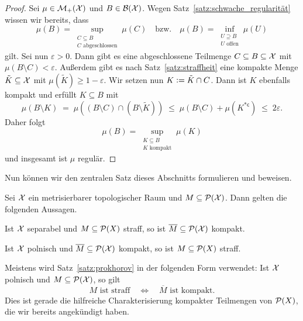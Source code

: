 \documentclass[../thesis/thesis.tex]{subfiles}
\begin{document}
	\begin{proof}
		Sei $\mu \in \mathcal{M}_{+}(\mathcal{X})$ und $B \in \mathcal{B}(\mathcal{X})$. 
		Wegen Satz~\ref{satz:schwache_regularität} wissen wir bereits, dass 
		\[\mu(B) = \sup_{\substack{C \subseteq B \\ C \text{ abgeschlossen}}} \mu(C) 
		\quad \text{bzw.} \quad \mu(B) = \inf_{\substack{U \supseteq B \\ U \text{ offen}}} 
		\mu(U)\]
		gilt. Sei nun $\varepsilon > 0$. Dann gibt es eine abgeschlossene Teilmenge 
		$C \subseteq B \subseteq \mathcal{X}$ mit $\mu(B \setminus C) < \varepsilon$. 
		Außerdem gibt es nach Satz~\ref{satz:straffheit} eine kompakte Menge 
		$\tilde{K} \subseteq \mathcal{X}$ mit $\mu(\tilde{K}) \geq 1 - \varepsilon$. Wir setzen nun $K \vcentcolon = \tilde{K} \cap C$. Dann ist $K$ ebenfalls kompakt und 
		erfüllt $K \subseteq B$ mit 
		\[ \mu(B \setminus K) 
		\; = \; \mu((B \setminus C) \cap (B \setminus \tilde{K})) 
		\; \leq \; \mu(B \setminus C) + \mu(K^{\ast \mathsf{c}}) 
		\; \leq \; 2 \varepsilon \text{.} \]
		Daher folgt 
		\[\mu(B) 
		= \sup_{\substack{K \subseteq B \\ K \text{ kompakt}}} \mu(K)\] 
		und insgesamt ist $\mu$ regulär.
	\end{proof}
	
	Nun können wir den zentralen Satz dieses Abschnitts formulieren und beweisen.
	
	\begin{Satz}[Prokhorov]
		\label{satz:prokhorov}
		Sei $\mathcal{X}$ ein metrisierbarer topologischer Raum und $M \subseteq \mathcal{P}(\mathcal{X})$. Dann gelten die folgenden Aussagen.
		\begin{enumeratethm}
			\item Ist $\mathcal{X}$ separabel und $M \subseteq \mathcal{P}(X)$ straff, so ist $\overline{M} \subseteq \mathcal{P}(\mathcal{X})$ kompakt.
			\item Ist $\mathcal{X}$ polnisch und $\overline{M} \subseteq \mathcal{P}(\mathcal{X})$ kompakt, so ist $M \subseteq \mathcal{P}(X)$ straff.
		\end{enumeratethm}
	\end{Satz}

	\begin{Bemerkung}
		Meistens wird Satz~\ref{satz:prokhorov} in der folgenden Form verwendet: Ist $\mathcal{X}$ polnisch und $M \subseteq \mathcal{P}(\mathcal{X})$, so gilt
		\[ M \text{ ist straff} \quad \iff \quad \overline{M} \text{ ist kompakt} \text{.} \]
		Dies ist gerade die hilfreiche Charakterisierung kompakter Teilmengen von $\mathcal{P}(X)$, die wir bereits angekündigt haben.
	\end{Bemerkung}
	
\end{document}
